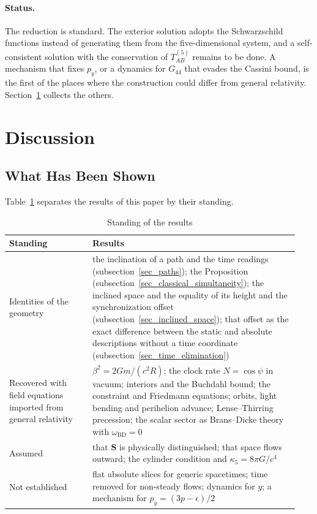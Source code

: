 \documentclass[anonymous]{iopjournal}
\begin{document}
\paragraph{Status.} The reduction is standard. The exterior solution adopts the Schwarzschild functions instead of generating them from the five-dimensional system, and a self-consistent solution with the conservation of $T^{(5)}_{AB}$ remains to be done. A mechanism that fixes $p_y$, or a dynamics for $G_{44}$ that evades the Cassini bound, is the first of the places where the construction could differ from general relativity. Section~\ref{sec_discussion} collects the others.

\section{Discussion}\label{sec_discussion}

\subsection{What Has Been Shown}\label{sec_what_it_is}

Table~\ref{table_status} separates the results of this paper by their standing.

\begin{table}[h]
\caption{Standing of the results}%
\label{table_status}
\begin{tabular}{@{}p{0.27\linewidth}p{0.67\linewidth}@{}}
\toprule
Standing & Results\\
\midrule
Identities of the geometry & the inclination of a path and the time readings (subsection~\ref{sec_paths}); the Proposition (subsection~\ref{sec_classical_simultaneity}); the inclined space and the equality of its height and the synchronization offset (subsection~\ref{sec_inclined_space}); that offset as the exact difference between the static and absolute descriptions without a time coordinate (subsection~\ref{sec_time_elimination})\\
Recovered with field equations imported from general relativity & $\beta^2=2Gm/(c^2R)$; the clock rate $N=\cos\psi$ in vacuum; interiors and the Buchdahl bound; the constraint and Friedmann equations; orbits, light bending and perihelion advance; Lense--Thirring precession; the scalar sector as Brans--Dicke theory with $\omega_{\mathrm{BD}}=0$\\
Assumed & that $\mathbf{S}$ is physically distinguished; that space flows outward; the cylinder condition and $\kappa_5=8\pi G/c^4$\\
Not established & flat absolute slices for generic spacetimes; time removed for non-steady flows; dynamics for $y$; a mechanism for $p_y=(3p-\epsilon)/2$\\
\bottomrule
\end{tabular}
\end{table}
\end{document}
